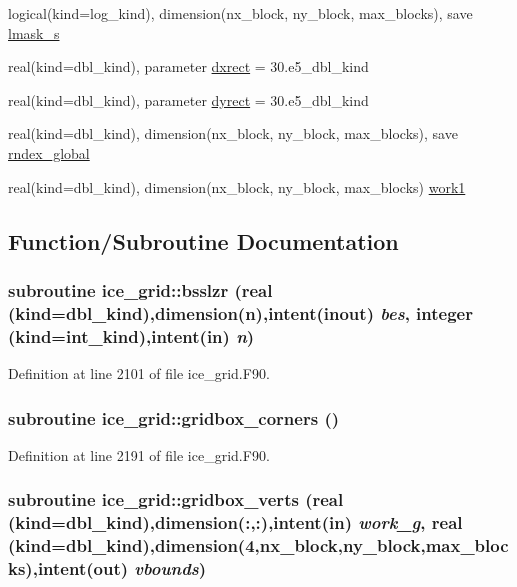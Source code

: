 \begin{DoxyCompactItemize}
logical(kind=log\_\-kind), dimension(nx\_\-block, ny\_\-block, max\_\-blocks), save \hyperlink{namespaceice__grid_aab33134c872608cbbcb505d3f788bb2d}{lmask\_\-s}
\item 
real(kind=dbl\_\-kind), parameter \hyperlink{namespaceice__grid_aea53b08fccd72dbe7e8a4689ab26534c}{dxrect} = 30.e5\_\-dbl\_\-kind
\item 
real(kind=dbl\_\-kind), parameter \hyperlink{namespaceice__grid_a5c8fd584afc136dde0c222634c2fe240}{dyrect} = 30.e5\_\-dbl\_\-kind
\item 
real(kind=dbl\_\-kind), dimension(nx\_\-block, ny\_\-block, max\_\-blocks), save \hyperlink{namespaceice__grid_ab75f2e02f6911b1eacbb7a0647f947b7}{rndex\_\-global}
\item 
real(kind=dbl\_\-kind), dimension(nx\_\-block, ny\_\-block, max\_\-blocks) \hyperlink{namespaceice__grid_a77ce4807a6b38d81367a3a7d67e2aa7c}{work1}
\end{DoxyCompactItemize}


\subsection{Function/Subroutine Documentation}
\hypertarget{namespaceice__grid_a26e7cc8fc629dd16d1f98839ebb9b5ff}{
\subsubsection[{bsslzr}]{\setlength{\rightskip}{0pt plus 5cm}subroutine ice\_\-grid::bsslzr (real (kind=dbl\_\-kind),dimension(n),intent(inout) {\em bes}, \/  integer (kind=int\_\-kind),intent(in) {\em n})}}
\label{namespaceice__grid_a26e7cc8fc629dd16d1f98839ebb9b5ff}


Definition at line 2101 of file ice\_\-grid.F90.\hypertarget{namespaceice__grid_a5cd4fd8007e449d3daca8a8ddd45b1b0}{
\subsubsection[{gridbox\_\-corners}]{\setlength{\rightskip}{0pt plus 5cm}subroutine ice\_\-grid::gridbox\_\-corners ()}}
\label{namespaceice__grid_a5cd4fd8007e449d3daca8a8ddd45b1b0}


Definition at line 2191 of file ice\_\-grid.F90.\hypertarget{namespaceice__grid_acfca25b6f395314aa5ccacde317d5bac}{
\subsubsection[{gridbox\_\-verts}]{\setlength{\rightskip}{0pt plus 5cm}subroutine ice\_\-grid::gridbox\_\-verts (real (kind=dbl\_\-kind),dimension(:,:),intent(in) {\em work\_\-g}, \/  real (kind=dbl\_\-kind),dimension(4,nx\_\-block,ny\_\-block,max\_\-blocks),intent(out) {\em vbounds})}}
\label{namespaceice__grid_acfca25b6f395314aa5ccacde317d5bac}


